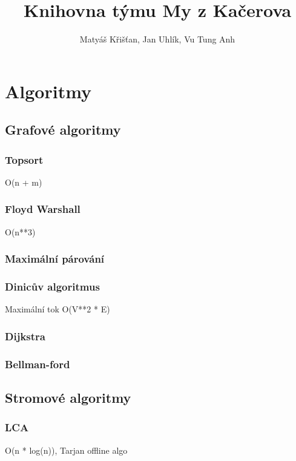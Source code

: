 \documentclass[10pt, a4paper]{article}
\title{Knihovna týmu My z Kačerova}
\author{Matyáš Křišťan, Jan Uhlík, Vu Tung Anh}
\begin{document}
\tableofcontents

\section{Algoritmy}
\subsection{Grafové algoritmy}

\subsubsection{Topsort}
O(n + m)


\subsubsection{Floyd Warshall}
O(n**3)


\subsubsection{Maximální párování}


\subsubsection{Dinicův algoritmus}
Maximální tok O(V**2 * E)


\subsubsection{Dijkstra}


\subsubsection{Bellman-ford}


\subsection{Stromové algoritmy}
\subsubsection{LCA}
O(n * log(n)), Tarjan offline algo

\end{document}

